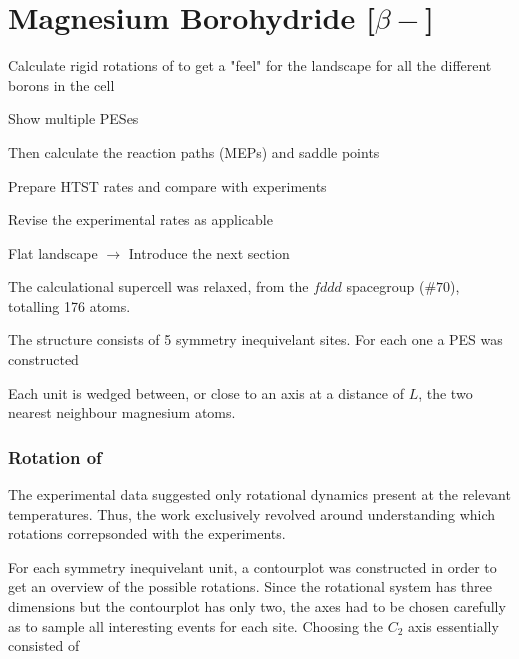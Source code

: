 \section{Magnesium Borohydride [$\beta-$]}
\label{sec:borohydrides-magnesium}

\bit
\item Calculate rigid rotations of  to get a "feel" for the landscape for all the different borons in the cell
\item Show multiple PESes
\item Then calculate the reaction paths (MEPs) and saddle points
\item Prepare HTST rates and compare with experiments
\item Revise the experimental rates as applicable
\item Flat landscape $\rightarrow$ Introduce the next section
\eit

The calculational supercell was relaxed, from the  $fddd$ spacegroup ($\#70$), totalling 176 atoms.

The structure consists of 5 symmetry inequivelant  sites.
For each one a PES was constructed



Each  unit is wedged between, or close to an axis at a distance of $L$, the two nearest neighbour magnesium atoms. \expand

\subsubsection{Rotation of }
The experimental data suggested only rotational dynamics present at the relevant temperatures.
Thus, the work exclusively revolved around understanding which rotations correpsonded with the experiments.

For each symmetry inequivelant  unit, a contourplot was constructed in order to get an overview of the possible rotations.
Since the rotational system has three dimensions but the contourplot has only two, the axes had to be chosen carefully as to sample all interesting events for each site.
Choosing the $C_2$ axis essentially consisted of 


\placeholder
